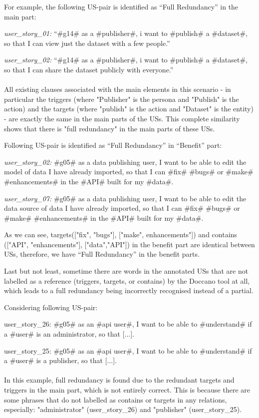 \begin{example}
	For example, the following US-pair is identified as \enquote{Full Redundancy} in the main part:
	
	\textit{user\_story\_01:} \enquote{\#g14\# as a \#publisher\#, i want to \#publish\# a \#dataset\#, so that I can view just the dataset with a few people.}
	
	\textit{user\_story\_02:} \enquote{\#g14\# as a \#publisher\#, i want to \#publish\# a \#dataset\#, so that I can share the dataset publicly with everyone.}\\\\
	All existing clauses associated with the main elements in this scenario - in particular the triggers (where "Publisher" is the persona and "Publish" is the action) and the targets (where "publish" is the action and "Dataset" is the entity) - are exactly the same in the main parts of the USs. This complete similarity shows that there is "full redundancy" in the main parts of these USs.
\end{example}
\begin{example}
	Following US-pair is identified as \enquote{Full Redundancy} in \enquote{Benefit} part:
	
	\textit{user\_story\_02:} \#g05\# as a data publishing user, I want to be able to edit the model of data I have already imported, so that I can \#fix\# \#bugs\# or \#make\# \#enhancements\# in the \#API\# built for my \#data\#.
	
	\textit{user\_story\_07:} \#g05\# as a data publishing user, I want to be able to edit the data source of data I have already imported, so that I can \#fix\# \#bugs\# or \#make\# \#enhancements\# in the \#API\# built for my \#data\#.
	
	As we can see, targets(["fix", "bugs"], ["make", enhancements"]) and contains (["API", "enhancements"], ["data","API"]) in the benefit part are identical between USs, therefore, we have \enquote{Full Redundancy} in the benefit parts.
\end{example}
Last but not least, sometime there are words in the annotated USs that are not labelled as a reference (triggers, targets, or contains) by the Doccano tool at all, which leads to a full redundancy being incorrectly recognised instead of a partial.
\begin{example}
	Considering following US-pair:
	
 	user\_story\_26: \#g05\# as an \#api user\#, I want to be able to \#understand\# if a \#user\# is an administrator, so that [...].
 	
 	user\_story\_25: \#g05\# as an \#api user\#, I want to be able to \#understand\# if a \#user\# is a publisher, so that [...].\\\\
	In this example, full redundancy is found due to the redundant targets and triggers in the main part, which is not entirely correct. This is because there are some phrases that do not labelled as contains or targets in any relations, especially: "administrator" (user\_story\_26) and "publisher" (user\_story\_25).
\end{example}
